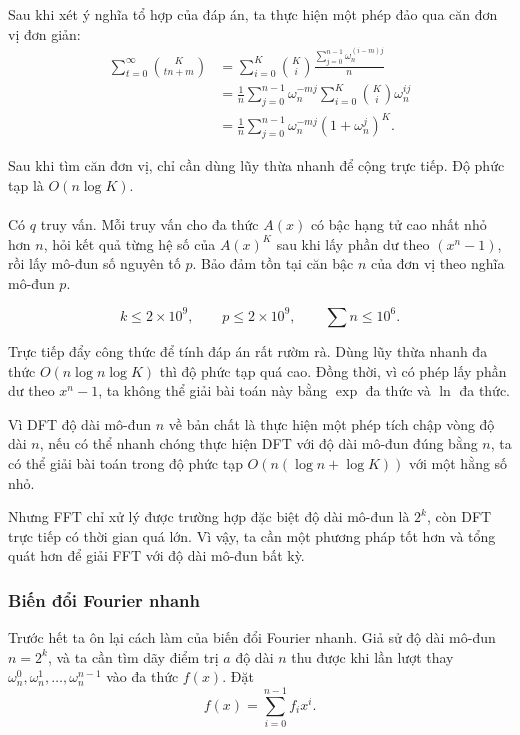 \documentclass[11pt]{article}
\begin{document}
 Sau khi xét ý nghĩa tổ hợp của đáp án, ta thực hiện một phép
đảo qua căn đơn vị đơn giản:
\[
\begin{aligned}
\sum_{t=0}^{\infty}\binom{K}{tn+m}
&=\sum_{i=0}^{K}\binom{K}{i}
  \frac{\sum_{j=0}^{n-1}\omega_n^{(i-m)j}}{n}\\
&=\frac1n\sum_{j=0}^{n-1}\omega_n^{-mj}
  \sum_{i=0}^{K}\binom{K}{i}\omega_n^{ij}\\
&=\frac1n\sum_{j=0}^{n-1}\omega_n^{-mj}(1+\omega_n^j)^K.
\end{aligned}
\]

Sau khi tìm căn đơn vị, chỉ cần dùng lũy thừa nhanh để cộng trực tiếp. Độ phức
tạp là \(O(n\log K)\).

\paragraph{}

 Có \(q\) truy vấn. Mỗi truy vấn cho đa thức \(A(x)\) có bậc hạng
tử cao nhất nhỏ hơn \(n\), hỏi kết quả từng hệ số của \(A(x)^K\) sau khi lấy
phần dư theo \((x^n-1)\), rồi lấy mô-đun số nguyên tố \(p\). Bảo đảm tồn tại
căn bậc \(n\) của đơn vị theo nghĩa mô-đun \(p\).

\[
k\le 2\times 10^9,\qquad p\le 2\times 10^9,\qquad \sum n\le 10^6.
\]

 Trực tiếp đẩy công thức để tính đáp án rất rườm rà. Dùng lũy
thừa nhanh đa thức \(O(n\log n\log K)\) thì độ phức tạp quá cao. Đồng thời, vì
có phép lấy phần dư theo \(x^n-1\), ta không thể giải bài toán này bằng
\(\exp\) đa thức và \(\ln\) đa thức.

Vì DFT độ dài mô-đun \(n\) về bản chất là thực hiện một phép tích chập vòng độ
dài \(n\), nếu có thể nhanh chóng thực hiện DFT với độ dài mô-đun đúng bằng
\(n\), ta có thể giải bài toán trong độ phức tạp \(O(n(\log n+\log K))\) với
một hằng số nhỏ.

Nhưng FFT chỉ xử lý được trường hợp đặc biệt độ dài mô-đun là \(2^k\), còn DFT
trực tiếp có thời gian quá lớn. Vì vậy, ta cần một phương pháp tốt hơn và tổng
quát hơn để giải FFT với độ dài mô-đun bất kỳ.

\subsubsection{Biến đổi Fourier nhanh}

Trước hết ta ôn lại cách làm của biến đổi Fourier nhanh. Giả sử độ dài mô-đun
\(n=2^k\), và ta cần tìm dãy điểm trị \(a\) độ dài \(n\) thu được khi lần lượt
thay \(\omega_n^0,\omega_n^1,\ldots,\omega_n^{n-1}\) vào đa thức \(f(x)\). Đặt
\[
f(x)=\sum_{i=0}^{n-1}f_i x^i.
\]
\end{document}
